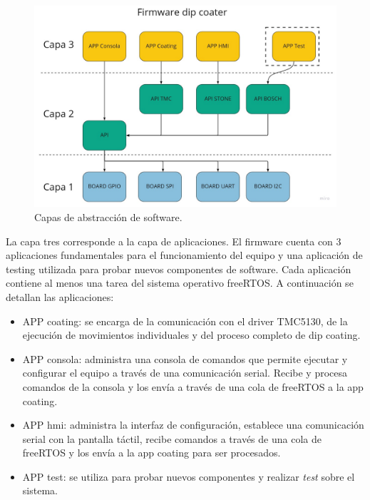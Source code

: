 \begin{figure}[h]
	\centering
	\includegraphics[width=1\textwidth]{./Figures/capas.jpg}
	\caption{Capas de abstracción de software.}
	\label{fig:capas}
\end{figure}


La capa tres corresponde a la capa de aplicaciones. El firmware cuenta con 3 aplicaciones fundamentales para el funcionamiento del equipo y una aplicación de testing utilizada para probar nuevos componentes de software. Cada aplicación contiene al menos una tarea del sistema operativo freeRTOS. A continuación se detallan las aplicaciones:

\begin{itemize}

\item APP coating: se encarga de la comunicación con el driver TMC5130, de la ejecución de movimientos individuales y del proceso completo de dip coating.
\item APP consola: administra una consola de comandos que permite ejecutar y configurar el equipo a través de una comunicación serial. Recibe y procesa comandos de la consola y los envía a través de una cola de freeRTOS a la app coating.
\item APP hmi: administra la interfaz de configuración, establece una comunicación serial con la pantalla táctil, recibe comandos a través de una cola de freeRTOS y los envía a la app coating para ser procesados.
\item APP test: se utiliza para probar nuevos componentes y realizar \textit{test} sobre el sistema.

\end{itemize}

